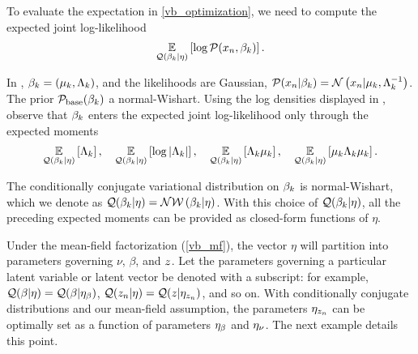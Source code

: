 \begin{ex}
%
To evaluate the expectation in \eqref{vb_optimization}, we need to compute
the expected joint log-likelihood
\begin{align*}
  \expect{\q(\beta_\k \vert \eta)}{\log \p(\x_\n, \beta_\k)}. %
\end{align*}

In , $\beta_k = (\mu_k, \Lambda_k)$,
and the likelihoods are Gaussian,
$\mathcal{P}(x_n \vert \beta_k) = \mathcal{N}\left(x_n \vert \mu_k, \Lambda_k^{-1}\right)$.
The prior $\mathcal{P}_{\mathrm{base}}(\beta_k)$ a normal-Wishart.
Using the log densities displayed in ,
observe that $\beta_k$ enters the expected joint log-likelihood only through the
expected moments
%
\begin{align*}
\underset{\mathcal{Q}(\beta_k \vert \eta)}{\mathbb{E}}\left[\Lambda_k\right],  \quad
\underset{\mathcal{Q}(\beta_k \vert \eta)}{\mathbb{E}}\left[\log|\Lambda_k|\right],  \quad
\underset{\mathcal{Q}(\beta_k \vert \eta)}{\mathbb{E}}\left[\Lambda_k\mu_k\right], \quad
\underset{\mathcal{Q}(\beta_k \vert \eta)}{\mathbb{E}}\left[\mu_k\Lambda_k\mu_k\right].
\end{align*}

The conditionally conjugate variational distribution on $\beta_k$ is
normal-Wishart, which we denote as
$\mathcal{Q}(\beta_k \vert \eta) = \mathcal{N}\mathcal{W}\left(\beta_k \vert \eta\right)$.
With this choice of $\mathcal{Q}(\beta_k \vert \eta)$,
all the preceding expected moments
can be provided as closed-form functions of $\eta$.
%
%
\end{ex}


Under the mean-field factorization (\eqref{vb_mf}),
the vector $\eta$ will partition into parameters
governing $\nu$, $\beta$, and $z$. Let the parameters governing a
particular latent variable or latent vector be denoted with a subscript: for example,
$\mathcal{Q}(\beta \vert \eta) = \mathcal{Q}(\beta \vert \eta_{\beta})$,
$\mathcal{Q}(z_n \vert \eta) = \mathcal{Q}(z \vert \eta_{z_{n}})$, and so on.
With conditionally conjugate distributions and our mean-field assumption,
the parameters $\eta_{z_{n}}$ can be optimally set as a function of
parameters $\eta_{\beta}$ and $\eta_{\nu}$.
The next example details this point.

